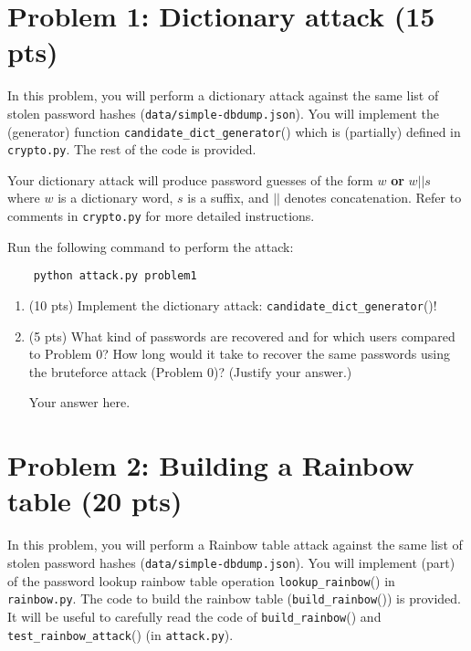 \documentclass[11pt,letterpaper]{article}
\newenvironment{answer}{\em \color{blue} \begin{adjustwidth}{1cm}{1cm}}{\end{adjustwidth}}
\begin{document}
\newpage
\section*{Problem 1: Dictionary attack (15 pts)}
%

In this problem, you will perform a dictionary attack against the same list of stolen password hashes (\texttt{data/simple-dbdump.json}). You will implement the (generator) function \texttt{candidate\_dict\_generator}() which is (partially) defined in \texttt{crypto.py}. The rest of the code is provided.

Your dictionary attack will produce password guesses of the form $w$ {\bf or} $w||s$ where $w$ is a dictionary word, $s$ is a suffix, and $||$ denotes concatenation. Refer to comments in \texttt{crypto.py} for more detailed instructions.

Run the following command to perform the attack:
%
\begin{Verbatim}
	python attack.py problem1
\end{Verbatim}
%

%
\begin{enumerate}
	\item (10 pts) Implement the dictionary attack: \texttt{candidate\_dict\_generator}()!
	
	\item (5 pts) What kind of passwords are recovered and for which users compared to Problem 0? How long would it take to recover the same passwords using the bruteforce attack (Problem 0)? (Justify your answer.)
	
	\begin{answer}
	
		Your answer here.
		
	\end{answer}

\end{enumerate}

\newpage
\section*{Problem 2: Building a Rainbow table (20 pts)}
%

In this problem, you will perform a Rainbow table attack against the same list of stolen password hashes (\texttt{data/simple-dbdump.json}). You will implement (part) of the password lookup rainbow table operation \texttt{lookup\_rainbow}() in \texttt{rainbow.py}. The code to build the rainbow table (\texttt{build\_rainbow}()) is provided. It will be useful to carefully read the code of \texttt{build\_rainbow}() and \texttt{test\_rainbow\_attack}() (in \texttt{attack.py}).
\end{document}
